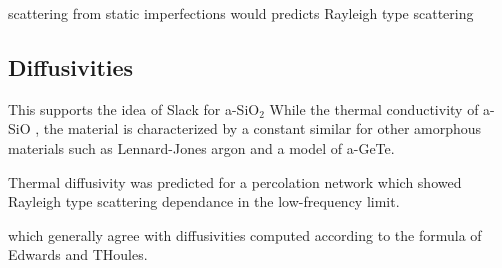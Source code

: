 \documentclass[aps,prb,twocolumn,superscriptaddress,footinbib,amsmath,amssymb,floatfix]{revtex4}
\begin{document}
scattering from static imperfections would predicts Rayleigh type 
scattering \cite{klemens_scattering_1955}




\subsection{\label{S:Diffusivities}Diffusivities}



This supports the idea of Slack for a-SiO$_2$\cite{slack_thermal_1979}
While the thermal conductivity of a-SiO , the material is characterized by 
a constant similar for other amorphous
materials such as Lennard-Jones argon\cite{larkin_predicting_2013} 
and a model of a-GeTe.\cite{sosso_thermal_2012}


Thermal diffusivity was predicted for a percolation network which showed 
Rayleigh type scattering dependance in the low-frequency limit.
\cite{sheng_heat_1991}

which generally agree with diffusivities computed according to the 
formula of Edwards and THoules.\cite{edwards_numerical_1972,
feldman_numerical_1999,beltukov_ioffe-regel_2013}
\end{document}
